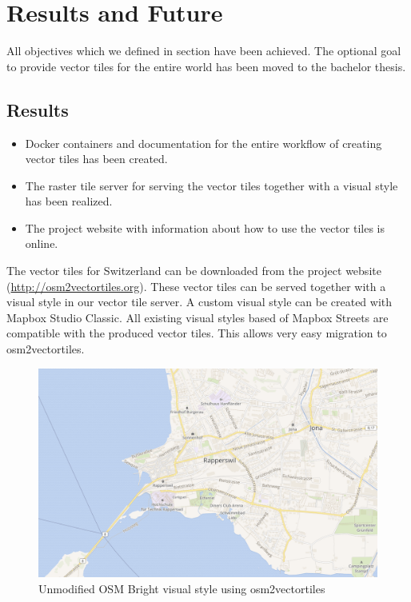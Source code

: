 \chapter{Results and Future}\label{part1_results_and_future}

All objectives which we defined in section  have been achieved. The optional goal to provide vector tiles for the entire world has been moved to the bachelor thesis.

\section{Results}\label{part1_results}

\begin{itemize}
\item
  Docker containers and documentation for the entire workflow of creating vector tiles has been created.
\item
  The raster tile server for serving the vector tiles together with a visual style has been realized.
\item
  The project website with information about how to use the vector tiles is online.
\end{itemize}

The vector tiles for Switzerland can be downloaded from the project website (\url{http://osm2vectortiles.org}). These vector tiles can be served together with a visual style in our vector tile server.
\newline{}
A custom visual style can be created with Mapbox Studio Classic\cite{mapbox_studio_classic}.
All existing visual styles based of Mapbox Streets are compatible with the produced vector tiles. This allows very easy migration to osm2vectortiles.

\begin{figure}[H]
  \includegraphics[width=1\textwidth]{images/unmodified_osm_bright.png}
  \caption{Unmodified OSM Bright visual style using osm2vectortiles}
\end{figure}

